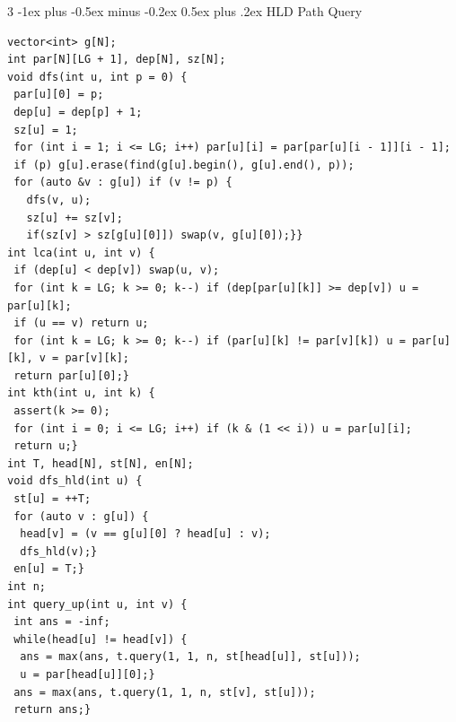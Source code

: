 \documentclass[8pt,a4paper,onesided]{article}
\makeatletter
\renewcommand{\subsection}{\@startsection{subsection}{2}{0mm}
    {-1ex plus -0.5ex minus -0.2ex} %
    {0.5ex plus .2ex}                %
    {\normalfont\large\bfseries}}    %
\makeatother
\begin{document}
\begin{multicols}{3}
\subsection{HLD Path Query}
\begin{verbatim}
vector<int> g[N];
int par[N][LG + 1], dep[N], sz[N];
void dfs(int u, int p = 0) {
 par[u][0] = p;
 dep[u] = dep[p] + 1;
 sz[u] = 1;
 for (int i = 1; i <= LG; i++) par[u][i] = par[par[u][i - 1]][i - 1];
 if (p) g[u].erase(find(g[u].begin(), g[u].end(), p));
 for (auto &v : g[u]) if (v != p) {
   dfs(v, u);
   sz[u] += sz[v];
   if(sz[v] > sz[g[u][0]]) swap(v, g[u][0]);}}
int lca(int u, int v) {
 if (dep[u] < dep[v]) swap(u, v);
 for (int k = LG; k >= 0; k--) if (dep[par[u][k]] >= dep[v]) u = par[u][k];
 if (u == v) return u;
 for (int k = LG; k >= 0; k--) if (par[u][k] != par[v][k]) u = par[u][k], v = par[v][k];
 return par[u][0];}
int kth(int u, int k) {
 assert(k >= 0);
 for (int i = 0; i <= LG; i++) if (k & (1 << i)) u = par[u][i];
 return u;}
int T, head[N], st[N], en[N];
void dfs_hld(int u) {
 st[u] = ++T;
 for (auto v : g[u]) {
  head[v] = (v == g[u][0] ? head[u] : v);
  dfs_hld(v);}
 en[u] = T;}
int n;
int query_up(int u, int v) {
 int ans = -inf;
 while(head[u] != head[v]) {
  ans = max(ans, t.query(1, 1, n, st[head[u]], st[u]));
  u = par[head[u]][0];}
 ans = max(ans, t.query(1, 1, n, st[v], st[u]));
 return ans;}
\end{verbatim}

\end{multicols}
\end{document}
